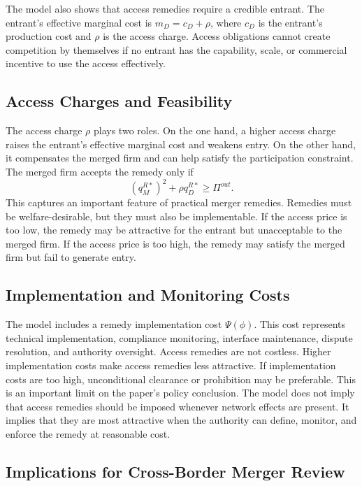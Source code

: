 \documentclass[12pt]{article}
\begin{document}
The model also shows that access remedies require a credible entrant. The entrant's effective marginal cost is $m_D=c_D+\rho$, where $c_D$ is the entrant's production cost and $\rho$ is the access charge. Access obligations cannot create competition by themselves if no entrant has the capability, scale, or commercial incentive to use the access effectively.

\subsection{Access Charges and Feasibility}

The access charge $\rho$ plays two roles. On the one hand, a higher access charge raises the entrant's effective marginal cost and weakens entry. On the other hand, it compensates the merged firm and can help satisfy the participation constraint. The merged firm accepts the remedy only if
\begin{equation}
(q_M^{R*})^2+\rho q_D^{R*}\geq \Pi^{out}.
\end{equation}
This captures an important feature of practical merger remedies. Remedies must be welfare-desirable, but they must also be implementable. If the access price is too low, the remedy may be attractive for the entrant but unacceptable to the merged firm. If the access price is too high, the remedy may satisfy the merged firm but fail to generate entry.

\subsection{Implementation and Monitoring Costs}

The model includes a remedy implementation cost $\Psi(\phi)$. This cost represents technical implementation, compliance monitoring, interface maintenance, dispute resolution, and authority oversight. Access remedies are not costless. Higher implementation costs make access remedies less attractive. If implementation costs are too high, unconditional clearance or prohibition may be preferable. This is an important limit on the paper's policy conclusion. The model does not imply that access remedies should be imposed whenever network effects are present. It implies that they are most attractive when the authority can define, monitor, and enforce the remedy at reasonable cost.

\subsection{Implications for Cross-Border Merger Review}
\end{document}
